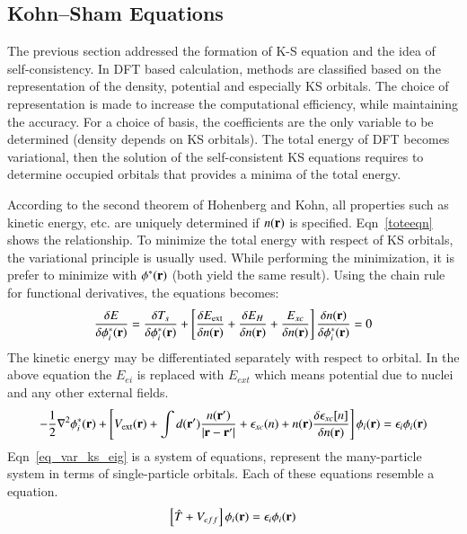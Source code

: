 \subsection{Kohn--Sham Equations}
The previous section addressed the formation of K-S equation and the idea of self-consistency. In DFT based calculation, methods are classified based on the representation of the density, potential and especially KS orbitals. The choice of representation is made to increase the computational efficiency, while maintaining the accuracy.
For a choice of basis, the coefficients are the only variable to be determined (density depends on KS orbitals). The total energy of DFT becomes variational, then the solution of the self-consistent KS equations requires to determine occupied orbitals that provides a minima of the total energy.

According to the second theorem of Hohenberg and Kohn, all properties such as kinetic energy, etc. are uniquely determined if $n(\vb{r})$ is specified. Eqn~\eqref{toteeqn} shows the relationship. To minimize the total energy with respect of KS orbitals, the variational principle is usually used. While performing the minimization, it is prefer to minimize with $\phi^{\ast}(\vb{r})$ (both yield the same result). Using the chain rule for functional derivatives, the equations becomes:
\begin{equation}
\label{eq_var_ks}
\frac{\delta E}{\delta \phi^{\ast}_i(\vb{r})} = \frac{\delta T_s}{\delta \phi^{\ast}_i(\vb{r})} + \left [ \frac{\delta E_{\text{ext}}}{\delta n(\vb{r})} + \frac{\delta E_H}{\delta n(\vb{r})} + \frac{E_{xc}}{\delta n(\vb{r})}	\right ] \frac{\delta n(\vb{r})}{\delta \phi^{\ast}_i(\vb{r})}  = 0
\end{equation}
The kinetic energy may be differentiated separately with respect to orbital. In the above equation the $E_{ei}$ is replaced with $E_{ext}$ which means potential due to nuclei and any other external fields.
\begin{equation}
\label{eq_var_ks_eig}
-\frac{1}{2} \nabla^2 \phi^{\ast}_i (\vb{r}) + \left [ V_{\text{ext}} (\vb{r}) + \int d(\vb{r'}) \frac{n(\vb{r'})}{\abs{\vb{r}-\vb{r'}}} + \epsilon_{xc} (n) + n(\vb{r}) \frac{\delta \epsilon_{xc}[n]}{\delta n(\vb{r})}   \right ] \phi_i(\vb{r})  = \epsilon_i \phi_i (\vb{r})
\end{equation}
Eqn~\ref{eq_var_ks_eig} is a system of equations, represent the many-particle system in terms of single-particle orbitals. Each of these equations resemble a \schrod equation.
\begin{equation}
\label{eq_ks_s}
\left [ \hat{T} + V_{eff}\right ] \phi_i (\vb{r}) = \epsilon_i \phi_i (\vb{r})
\end{equation}

